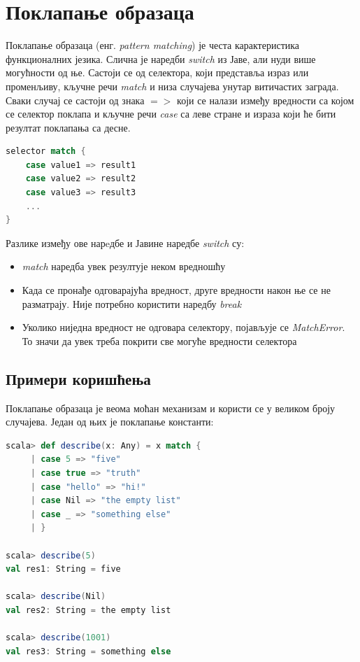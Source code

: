 \documentclass[12pt,oneside]{memoir}
\begin{document}
\section{Поклапање образаца}
\label{sec:scala_patt_match}

Поклапање образаца (енг. \textit{pattern matching}) је честа карактеристика функционалних језика. Слична је наредби \textit{switch} из Јаве, али нуди више могућности од ње. Састоји се од селектора, који представља израз или променљиву, кључне речи \textit{match} и низа случајева унутар витичастих заграда. Сваки случај се састоји од знака $=>$ који се налази између вредности са којом се селектор поклапа и кључне речи \textit{case} са леве стране и израза који ће бити резултат поклапања са десне. \cite{scala_prog}

\begin{lstlisting}[language=Scala, caption={Поклапање образаца у Скали}, label={lst:scala_coll_patt_match}]
selector match {
	case value1 => result1
	case value2 => result2
	case value3 => result3
	...
}
\end{lstlisting}

Разлике између ове нарeдбе и Јавине наредбе \textit{switch} су:

\begin{itemize}
\item \textit{match} наредба увек резултује неком вредношћу
\item Када се пронађе одговарајућа вредност, друге вредности након ње се не разматрају. Није потребно користити наредбу \textit{break}
\item Уколико ниједна вредност не одговара селектору, појављује се \textit{MatchError}. То значи да увек треба покрити све могуће вредности селектора
\end{itemize}

\subsection{Примери коришћења}
\label{subsec:scala_match_exaples}

Поклапање образаца је веома моћан механизам и користи се у великом броју случајева. Један од њих је поклапање константи:

\begin{lstlisting}[language=Scala, caption={Поклапање константи}, label={lst:scala_patt_match_match_const_example}]
scala> def describe(x: Any) = x match {
     | case 5 => "five"
     | case true => "truth"
     | case "hello" => "hi!"
     | case Nil => "the empty list"
     | case _ => "something else"
     | }
     
scala> describe(5)
val res1: String = five

scala> describe(Nil)
val res2: String = the empty list

scala> describe(1001)
val res3: String = something else
\end{lstlisting}
\end{document}

